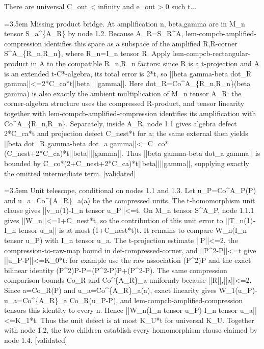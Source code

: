 \documentclass{article}
\newcommand{\step}[1]{\par\noindent\hangindent=3.5em\hangafter=1%
  \makebox[3.5em][l]{\textbf{#1.}}}
\newcommand{\steptag}[1]{\hfill{\small\textsf{[#1]}}}
\begin{document}
\begin{proofbox}{There are universal C\_out < infinity and e\_out > 0 such t...}
\step{1.4.1.1} Missing product bridge. At amplification n, beta,gamma are in M\_n tensor S\_a\textasciicircum{}\{A\_R\} by node 1.2. Because A\_R=S\_R\textasciicircum{}A, lem-compcb-amplified-compression identifies this space as a subspace of the amplified R,R-corner S\textasciicircum{}A\_\{R\_n,R\_n\}, where R\_n=I\_n tensor R. Apply lem-compcb-rectangular-product in A to the compatible R\_n,R\_n factors: since R is a t-projection and A is an extended t-C*-algebra, its total error is 2*t, so ||beta gamma-beta dot\_R gamma||<=2*C\_co*t||beta||||gamma||. Here dot\_R=Co\textasciicircum{}A\_\{R\_n,R\_n\}(beta gamma) is also exactly the ambient multiplication of M\_n tensor A\_R: the corner-algebra structure uses the compressed R-product, and tensor linearity together with lem-compcb-amplified-compression identifies its amplification with Co\textasciicircum{}A\_\{R\_n,R\_n\}. Separately, inside A\_R, node 1.1 gives algebra defect 2*C\_ca*t and projection defect C\_nest*t for a; the same external then yields ||beta dot\_R gamma-beta dot\_a gamma||<=C\_co*(C\_nest+2*C\_ca)*t||beta||||gamma||. Thus ||beta gamma-beta dot\_a gamma|| is bounded by C\_co*(2+C\_nest+2*C\_ca)*t||beta||||gamma||, supplying exactly the omitted intermediate term. \steptag{validated} \\[4pt]
\step{1.4.2} Unit telescope, conditional on nodes 1.1 and 1.3. Let u\_P=Co\textasciicircum{}A\_P(P) and u\_a=Co\textasciicircum{}\{A\_R\}\_a(a) be the compressed units. The t-homomorphism unit clause gives ||v\_n(1)-I\_n tensor u\_P||<=t. On M\_n tensor S\textasciicircum{}A\_P, node 1.1.1 gives ||W\_n||<=1+C\_nest*t, so the contribution of this unit error to ||T\_n(1)-I\_n tensor u\_a|| is at most (1+C\_nest*t)t. It remains to compare W\_n(I\_n tensor u\_P) with I\_n tensor u\_a. The t-projection estimate ||P||<=2, the compression-to-raw-map bound in def-compressed-corner, and ||P\textasciicircum{}2-P||<=t give ||u\_P-P||<=K\_0*t: for example use the raw association (P\textasciicircum{}2)P and the exact bilinear identity (P\textasciicircum{}2)P-P=(P\textasciicircum{}2-P)P+(P\textasciicircum{}2-P). The same compression comparison bounds Co\_R and Co\textasciicircum{}\{A\_R\}\_a uniformly because ||R||,||a||<=2. Since a=Co\_R(P) and u\_a=Co\textasciicircum{}\{A\_R\}\_a(a), exact linearity gives W\_1(u\_P)-u\_a=Co\textasciicircum{}\{A\_R\}\_a Co\_R(u\_P-P), and lem-compcb-amplified-compression tensors this identity to every n. Hence ||W\_n(I\_n tensor u\_P)-I\_n tensor u\_a||<=K\_1*t. Thus the unit defect is at most K\_U*t for universal K\_U. Together with node 1.2, the two children establish every homomorphism clause claimed by node 1.4. \steptag{validated} \\[4pt]

\end{proofbox}
\end{document}
